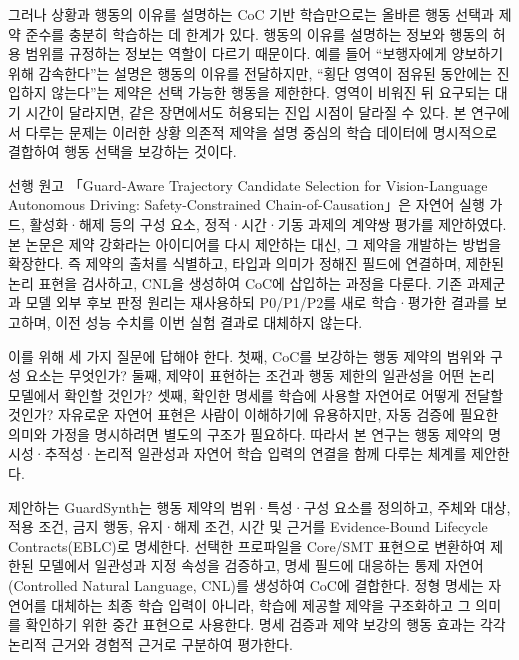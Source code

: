 \documentclass[10pt,a4paper,twocolumn]{article}\usepackage[margin=18mm]{geometry}\usepackage{fontspec,kotex}
\begin{document}
그러나 상황과 행동의 이유를 설명하는 CoC 기반 학습만으로는 올바른 행동 선택과 제약 준수를 충분히 학습하는 데 한계가 있다. 행동의 이유를 설명하는 정보와 행동의 허용 범위를 규정하는 정보는 역할이 다르기 때문이다. 예를 들어 “보행자에게 양보하기 위해 감속한다”는 설명은 행동의 이유를 전달하지만, “횡단 영역이 점유된 동안에는 진입하지 않는다”는 제약은 선택 가능한 행동을 제한한다. 영역이 비워진 뒤 요구되는 대기 시간이 달라지면, 같은 장면에서도 허용되는 진입 시점이 달라질 수 있다. 본 연구에서 다루는 문제는 이러한 상황 의존적 제약을 설명 중심의 학습 데이터에 명시적으로 결합하여 행동 선택을 보강하는 것이다.\par

선행 원고 「Guard-Aware Trajectory Candidate Selection for Vision-Language Autonomous Driving: Safety-Constrained Chain-of-Causation」은 자연어 실행 가드, 활성화·해제 등의 구성 요소, 정적·시간·기동 과제의 계약쌍 평가를 제안하였다. 본 논문은 제약 강화라는 아이디어를 다시 제안하는 대신, 그 제약을 개발하는 방법을 확장한다. 즉 제약의 출처를 식별하고, 타입과 의미가 정해진 필드에 연결하며, 제한된 논리 표현을 검사하고, CNL을 생성하여 CoC에 삽입하는 과정을 다룬다. 기존 과제군과 모델 외부 후보 판정 원리는 재사용하되 P0/P1/P2를 새로 학습·평가한 결과를 보고하며, 이전 성능 수치를 이번 실험 결과로 대체하지 않는다. \cite{r4}\par

이를 위해 세 가지 질문에 답해야 한다. 첫째, CoC를 보강하는 행동 제약의 범위와 구성 요소는 무엇인가? 둘째, 제약이 표현하는 조건과 행동 제한의 일관성을 어떤 논리 모델에서 확인할 것인가? 셋째, 확인한 명세를 학습에 사용할 자연어로 어떻게 전달할 것인가? 자유로운 자연어 표현은 사람이 이해하기에 유용하지만, 자동 검증에 필요한 의미와 가정을 명시하려면 별도의 구조가 필요하다. 따라서 본 연구는 행동 제약의 명시성·추적성·논리적 일관성과 자연어 학습 입력의 연결을 함께 다루는 체계를 제안한다.\par

제안하는 GuardSynth는 행동 제약의 범위·특성·구성 요소를 정의하고, 주체와 대상, 적용 조건, 금지 행동, 유지·해제 조건, 시간 및 근거를 Evidence-Bound Lifecycle Contracts(EBLC)로 명세한다. 선택한 프로파일을 Core/SMT 표현으로 변환하여 제한된 모델에서 일관성과 지정 속성을 검증하고, 명세 필드에 대응하는 통제 자연어(Controlled Natural Language, CNL)를 생성하여 CoC에 결합한다. 정형 명세는 자연어를 대체하는 최종 학습 입력이 아니라, 학습에 제공할 제약을 구조화하고 그 의미를 확인하기 위한 중간 표현으로 사용한다. 명세 검증과 제약 보강의 행동 효과는 각각 논리적 근거와 경험적 근거로 구분하여 평가한다.\par
\end{document}
